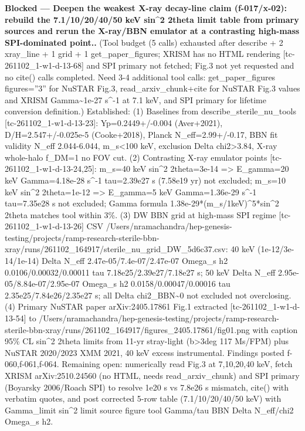\documentclass[11pt,a4paper]{article}
\begin{document}
\textbf{Blocked --- Deepen the weakest X-ray decay-line claim (f-017/x-02): rebuild the 7.1/10/20/40/50 keV sin\textasciicircum{}2 2theta limit table from primary sources and rerun the X-ray/BBN emulator at a contrasting high-mass SPI-dominated point..} (Tool budget (5 calls) exhausted after describe + 2 xray\_line + 1 grid + 1 get\_paper\_figures; XRISM has no HTML rendering [tc-261102\_1-w1-d-13-68] and SPI primary not fetched; Fig.3 not yet requested and no cite() calls completed. Need 3-4 additional tool calls: get\_paper\_figures figures=''3'' for NuSTAR Fig.3, read\_arxiv\_chunk+cite for NuSTAR Fig.3 values and XRISM Gamma\textasciitilde{}1e-27 s\textasciicircum{}-1 at 7.1 keV, and SPI primary for lifetime conversion definition.) Established: (1) Baselines from describe\_sterile\_nu\_tools [tc-261102\_1-w1-d-13-23]: Yp=0.2449+/-0.004 (Aver+2021), D/H=2.547+/-0.025e-5 (Cooke+2018), Planck N\_eff=2.99+/-0.17, BBN fit validity N\_eff 2.044-6.044, m\_s\textless{}100 keV, exclusion Delta chi2\textgreater{}3.84, X-ray whole-halo f\_DM=1 no FOV cut. (2) Contrasting X-ray emulator points [tc-261102\_1-w1-d-13-24,25]: m\_s=40 keV sin\textasciicircum{}2 2theta=3e-14 =\textgreater{} E\_gamma=20 keV Gamma=4.18e-28 s\textasciicircum{}-1 tau=2.39e27 s (7.58e19 yr) not excluded; m\_s=10 keV sin\textasciicircum{}2 2theta=1e-12 =\textgreater{} E\_gamma=5 keV Gamma=1.36e-29 s\textasciicircum{}-1 tau=7.35e28 s not excluded; Gamma formula 1.38e-29*(m\_s/1keV)\textasciicircum{}5*sin\textasciicircum{}2 2theta matches tool within 3\%. (3) DW BBN grid at high-mass SPI regime [tc-261102\_1-w1-d-13-26] CSV /Users/nramachandra/hep-genesis-testing/projects/ramp-research-sterile-bbn-xray/runs/261102\_164917/sterile\_nu\_grid\_DW\_5d6c37.csv: 40 keV (1e-12/3e-14/1e-14) Delta N\_eff 2.47e-05/7.4e-07/2.47e-07 Omega\_s h2 0.0106/0.00032/0.00011 tau 7.18e25/2.39e27/7.18e27 s; 50 keV Delta N\_eff 2.95e-05/8.84e-07/2.95e-07 Omega\_s h2 0.0158/0.00047/0.00016 tau 2.35e25/7.84e26/2.35e27 s; all Delta chi2\_BBN\textasciitilde{}0 not excluded not overclosing. (4) Primary NuSTAR paper arXiv:2405.17861 Fig.1 extracted [tc-261102\_1-w1-d-13-54] to /Users/nramachandra/hep-genesis-testing/projects/ramp-research-sterile-bbn-xray/runs/261102\_164917/figures\_2405.17861/fig01.png with caption 95\% CL sin\textasciicircum{}2 2theta limits from 11-yr stray-light (\textbar{}b\textbar{}\textgreater{}3deg 117 Ms/FPM) plus NuSTAR 2020/2023 XMM 2021, 40 keV excess instrumental. Findings posted f-060,f-061,f-064. Remaining open: numerically read Fig.3 at 7,10,20,40 keV, fetch XRISM arXiv:2510.24560 (no HTML, needs read\_arxiv\_chunk) and SPI primary (Boyarsky 2006/Roach SPI) to resolve 1e20 s vs 7.8e26 s mismatch, cite() with verbatim quotes, and post corrected 5-row table (7.1/10/20/40/50 keV) with Gamma\_limit sin\textasciicircum{}2 limit source figure tool Gamma/tau BBN Delta N\_eff/chi2 Omega\_s h2.
\end{document}

